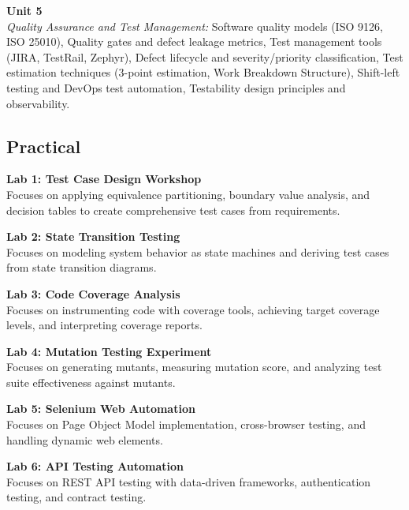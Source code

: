 \vspace{0.3cm}

\noindent\textbf{Unit 5} \\
\textit{Quality Assurance and Test Management:} Software quality models (ISO 9126, ISO 25010), Quality gates and defect leakage metrics, Test management tools (JIRA, TestRail, Zephyr), Defect lifecycle and severity/priority classification, Test estimation techniques (3-point estimation, Work Breakdown Structure), Shift-left testing and DevOps test automation, Testability design principles and observability.

\newpage

\subsection*{Practical}
\noindent\textbf{Lab 1: Test Case Design Workshop} \\
Focuses on applying equivalence partitioning, boundary value analysis, and decision tables to create comprehensive test cases from requirements.

\vspace{0.2cm}

\noindent\textbf{Lab 2: State Transition Testing} \\
Focuses on modeling system behavior as state machines and deriving test cases from state transition diagrams.

\vspace{0.2cm}

\noindent\textbf{Lab 3: Code Coverage Analysis} \\
Focuses on instrumenting code with coverage tools, achieving target coverage levels, and interpreting coverage reports.

\vspace{0.2cm}

\noindent\textbf{Lab 4: Mutation Testing Experiment} \\
Focuses on generating mutants, measuring mutation score, and analyzing test suite effectiveness against mutants.

\vspace{0.2cm}

\noindent\textbf{Lab 5: Selenium Web Automation} \\
Focuses on Page Object Model implementation, cross-browser testing, and handling dynamic web elements.

\vspace{0.2cm}

\noindent\textbf{Lab 6: API Testing Automation} \\
Focuses on REST API testing with data-driven frameworks, authentication testing, and contract testing.


